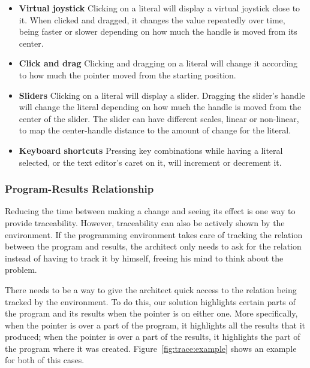 \begin{itemize}
  \item {\bf Virtual joystick} Clicking on a literal will display a virtual joystick close to it. When clicked and dragged, it changes the value repeatedly over time, being faster or slower depending on how much the handle is moved from its center.
  \item {\bf Click and drag} Clicking and dragging on a literal will change it according to how much the pointer moved from the starting position.
  \item {\bf Sliders} Clicking on a literal will display a slider. Dragging the slider's handle will change the literal depending on how much the handle is moved from the center of the slider. The slider can have different scales, linear or non-linear, to map the center-handle distance to the amount of change for the literal.
  \item {\bf Keyboard shortcuts} Pressing key combinations while having a literal selected, or the text editor's caret on it, will increment or decrement it.
\end{itemize}


\subsubsection{Program-Results Relationship}
Reducing the time between making a change and seeing its effect is one way to provide traceability.
However, traceability can also be actively shown by the environment.
If the programming environment takes care of tracking the relation between the program and results, the architect only needs to ask for the relation instead of having to track it by himself, freeing his mind to think about the problem.

There needs to be a way to give the architect quick access to the relation being tracked by the environment.
To do this, our solution highlights certain parts of the program and  its results when the pointer is on either one.
More specifically, when the pointer is over a part of the program, it highlights all the results that it produced;
when the pointer is over a part of the results, it highlights the part of the program where it was created.
Figure~\ref{fig:trace:example} shows an example for both of this cases.

